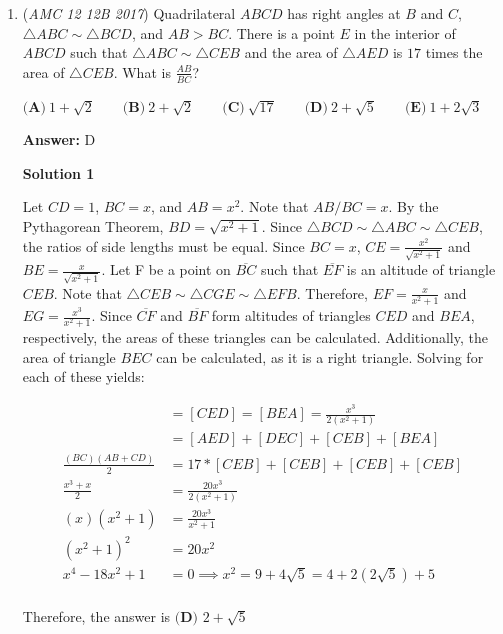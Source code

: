 \begin{enumerate}
 The specific structure of this system of equations allows it to be solved with relatively ease. Solving, we get $d=\frac{24}{5}$



	\item (\textit{AMC 12 12B 2017}) Quadrilateral $ABCD$ has right angles at $B$ and $C$, $\triangle ABC \sim \triangle BCD$, and $AB > BC$. There is a point $E$ in the interior of $ABCD$ such that $\triangle ABC \sim \triangle CEB$ and the area of $\triangle AED$ is $17$ times the area of $\triangle CEB$. What is $\frac{AB}{BC}$?


 $\textbf{(A)}\ 1 + \sqrt{2} \qquad \textbf{(B)}\ 2 + \sqrt{2} \qquad \textbf{(C)}\ \sqrt{17} \qquad \textbf{(D)}\ 2 + \sqrt{5} \qquad\textbf{(E)}\ 1 + 2\sqrt{3}$

 \textbf{Answer: }D



\textbf{Solution 1}

Let $CD=1$, $BC=x$, and $AB=x^2$. Note that $AB/BC=x$. By the Pythagorean Theorem, $BD=\sqrt{x^2+1}$. Since $\triangle BCD \sim \triangle ABC \sim \triangle CEB$, the ratios of side lengths must be equal. Since $BC=x$, $CE=\frac{x^2}{\sqrt{x^2+1}}$ and $BE=\frac{x}{\sqrt{x^2+1}}$. Let F be a point on $\overline{BC}$ such that $\overline{EF}$ is an altitude of triangle $CEB$. Note that $\triangle CEB \sim \triangle CGE \sim \triangle EFB$. Therefore, $EF=\frac{x}{x^2+1}$ and $EG=\frac{x^3}{x^2+1}$. Since $\overline{CF}$ and $\overline{BF}$ form altitudes of triangles $CED$ and $BEA$, respectively, the areas of these triangles can be calculated. Additionally, the area of triangle $BEC$ can be calculated, as it is a right triangle. Solving for each of these yields:

 \begin{align*}[BEC] &=[CED]=[BEA]=\frac{x^3}{2(x^2+1)} \\[ABCD] &=[AED]+[DEC]+[CEB]+[BEA] \\\frac{(BC)(AB+CD)}{2} &= 17*[CEB]+ [CEB] + [CEB] + [CEB] \\\frac{x^3+x}{2} &= \frac{20x^3}{2(x^2+1)} \\(x)(x^2+1) &= \frac{20x^3}{x^2+1} \\(x^2+1)^2 &=20x^2 \\x^4-18x^2+1 &=0 \implies x^2=9+4\sqrt{5}=4+2(2\sqrt{5})+5 \\\end{align*}


 Therefore, the answer is $\boxed{\textbf{(D) } 2+\sqrt{5}}$





\end{enumerate}
